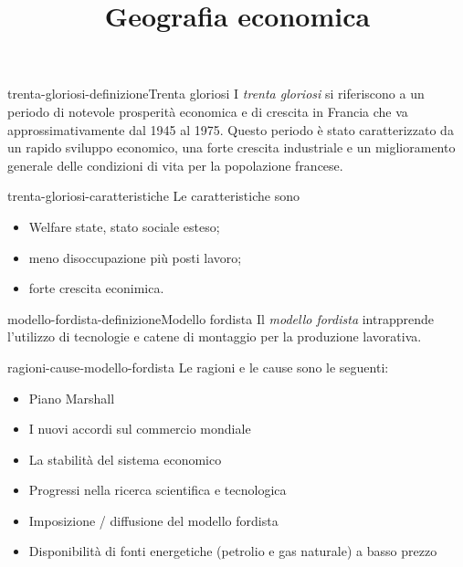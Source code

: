 \documentclass[preview]{standalone}
\begin{document}
\title{Geografia economica}
\genpage

\begin{snippetdefinition}{trenta-gloriosi-definizione}{Trenta gloriosi}
    I \textit{trenta gloriosi} si riferiscono a un periodo di notevole prosperità economica e di crescita in Francia
    che va approssimativamente dal 1945 al 1975. Questo periodo è stato caratterizzato da un rapido
    sviluppo economico, una forte crescita industriale e un miglioramento generale delle condizioni di
    vita per la popolazione francese.
\end{snippetdefinition}

\begin{snippet}{trenta-gloriosi-caratteristiche}
    Le caratteristiche sono
    \begin{itemize}
        \item Welfare state, stato sociale esteso;
        \item meno disoccupazione più posti lavoro;
        \item forte crescita econimica.
    \end{itemize}
\end{snippet}

\begin{snippetdefinition}{modello-fordista-definizione}{Modello fordista}
    Il \textit{modello fordista} intrapprende l'utilizzo di tecnologie e catene di montaggio
    per la produzione lavorativa.
\end{snippetdefinition}

\begin{snippet}{ragioni-cause-modello-fordista}
    Le ragioni e le cause sono le seguenti:
    \begin{itemize}
        \item Piano Marshall
        \item I nuovi accordi sul commercio mondiale
        \item La stabilità del sistema economico
        \item Progressi nella ricerca scientifica e tecnologica
        \item Imposizione / diffusione del modello fordista
        \item Disponibilità di fonti energetiche (petrolio e gas naturale) a basso prezzo
    \end{itemize}
\end{snippet}
\end{document}
